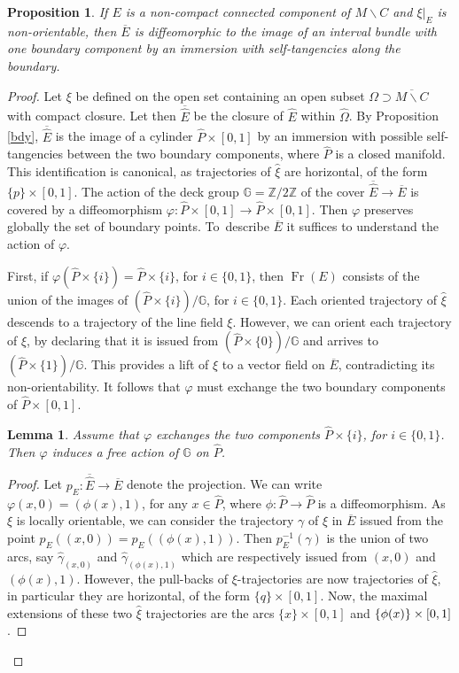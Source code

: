 \documentclass[JEP,XML,SOM,Unicode]{cedram}
\let\moins\smallsetminus
\DeclareMathOperator{\Fr}{Fr}
\newtheorem{lemma}[theorem]{Lemma}
\newtheorem{proposition}[theorem]{Proposition}
\theoremstyle{definition}
\theoremstyle{remark}
\numberwithin{equation}{section}
\newcommand{\ZZ}{\mathbb Z}
\begin{document}
\begin{proposition}\label{Ibundles}
If $E$ is a non-compact connected component of $M\moins C$ and $\xi|_E$ is non-orientable,
then $\overline{E}$ is diffeomorphic to the image of
an interval bundle with one boundary component by an immersion with self-tangencies along the
boundary.
\end{proposition}
\begin{proof}
Let $\xi$ be defined on the open set containing an open subset $\Omega\supset \overline{M\moins C}$ with compact closure.
Let then $\overline{\widehat{E}}$ be the closure of $\widehat{E}$ within $\widehat{\Omega}$.
By Proposition \ref{bdy}, $\overline{\widehat{E}}$ is the image of a cylinder
$\widehat{P}\times [0,1]$ by an immersion with possible self-tangencies between
the two boundary components, where $\widehat{P}$ is a closed manifold.
This identification is canonical, as trajectories of $\widehat{\xi}$ are horizontal, \ie of the form $\{p\}\times [0,1]$. The action of the deck group $\mathbb G=\ZZ/2\ZZ$ of the cover
$\overline{\widehat{E}}\to \overline{E}$ is covered by
a diffeomorphism $\varphi:\widehat{P}\times [0,1]\to \widehat{P}\times [0,1]$.
Then $\varphi$ preserves globally the set of boundary points.
To~describe $\overline{E}$ it suffices to understand the action of $\varphi$.

First, if $\varphi(\widehat{P}\times \{i\})=\widehat{P}\times \{i\}$, for $i\in \{0,1\}$,
then $\Fr(E)$ consists of the union of the images of
$(\widehat{P}\times \{i\})/\mathbb G$, for $i\in \{0,1\}$.
Each oriented trajectory of $\widehat{\xi}$ descends to a trajectory of the line field $\xi$.
However, we can orient each trajectory of $\xi$, by declaring that it is
issued from $(\widehat{P}\times \{0\})/\mathbb G$ and arrives to
$(\widehat{P}\times \{1\})/\mathbb G$.
This provides a lift of $\xi$ to a vector field on $\overline{E}$,
contradicting its non-orientability. It follows that $\varphi$ must exchange the two boundary components of $\widehat{P}\times [0,1]$.

\begin{lemma}\label{invol}
Assume that $\varphi$ exchanges the two components $\widehat{P}\times \{i\}$, for $i\in \{0,1\}$.
Then $\varphi$ induces
a free action of $\mathbb G$ on $\widehat{P}$.
\end{lemma}
\begin{proof}
Let $p_E:\overline{\widehat{E}}\to \overline{E}$ denote the projection.
We can write $\varphi(x,0)=(\phi(x),1)$, for any $x\in \widehat{P}$, where $\phi:\widehat{P}\to \widehat{P}$ is a diffeomorphism.
As $\xi$ is locally orientable, we can consider the trajectory $\gamma$ of $\xi$ in $\overline{E}$ issued from the point
$p_E((x,0))=p_E((\phi(x),1))$. Then $p_E^{-1}(\gamma)$ is the union of two arcs, say $\widehat{\gamma}_{(x,0)}$ and
$\widehat{\gamma}_{(\phi(x),1)}$ which are respectively issued from $(x,0)$ and $(\phi(x),1)$.
However, the pull-backs of $\xi$-trajectories are now trajectories of $\widehat{\xi}$, in particular they are
horizontal, \ie of the form $\{q\}\times [0,1]$.
Now, the maximal extensions of these two $\widehat{\xi}$ trajectories are the
arcs $\{x\}\times [0,1]$ and $\{\phi(x)\}\times\nobreak [0,1]$.


\end{proof}
\end{proof}
\end{document}

